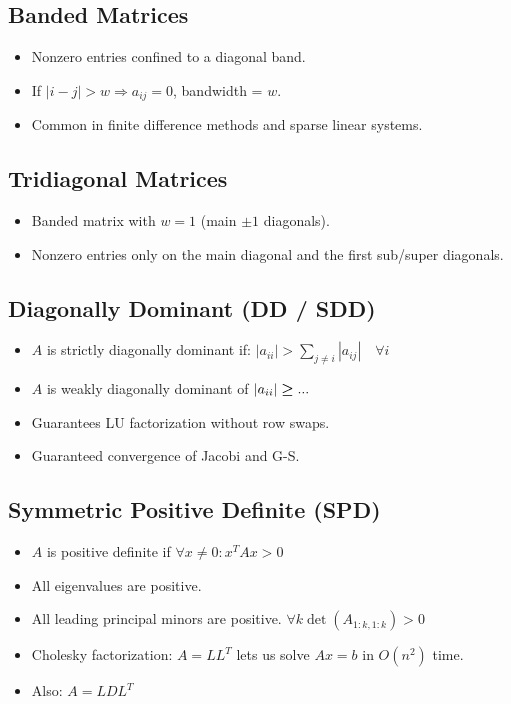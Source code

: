 \documentclass[8pt, letterpaper]{extarticle}
\begin{document}
\begin{multicols*}{3}
  \subsection{Banded Matrices}
  \begin{itemize}
    \item Nonzero entries confined to a diagonal band.
    \item If $|i - j| > w \Rightarrow a_{ij} = 0$, bandwidth = $w$.
    \item Common in finite difference methods and sparse linear systems.
  \end{itemize}

  \subsection{Tridiagonal Matrices}
  \begin{itemize}
    \item Banded matrix with $w=1$ (main $\pm 1$ diagonals).
    \item Nonzero entries only on the main diagonal and the first sub/super
      diagonals.
  \end{itemize}

  \subsection{Diagonally Dominant (DD / SDD)}
  \begin{itemize}
    \item $ A $ is strictly diagonally dominant if: \newline
      $\displaystyle|a_{ii}| > \sum_{j \ne i} |a_{ij}| \quad \forall i$
    \item $A$ is weakly diagonally dominant of $\abs{a_{ii}} \boldsymbol{\geq} ...$
    \item Guarantees LU factorization without row swaps.
    \item Guaranteed convergence of Jacobi and G-S.
  \end{itemize}

  \subsection{Symmetric Positive Definite (SPD)}
  \begin{itemize}
    \item $ A $ is positive definite if
      $\forall x \ne 0 : x^T A x > 0$
    \item All eigenvalues are positive.
    \item All leading principal minors are positive. $\forall k\det(A_{1:k, 1:k}) > 0$
    \item Cholesky factorization: $A = LL^T$ lets us solve $Ax=b$ in $O(n^2)$
      time.
    \item Also: $A = LDL^T$
  \end{itemize}


\end{multicols*}
\end{document}
